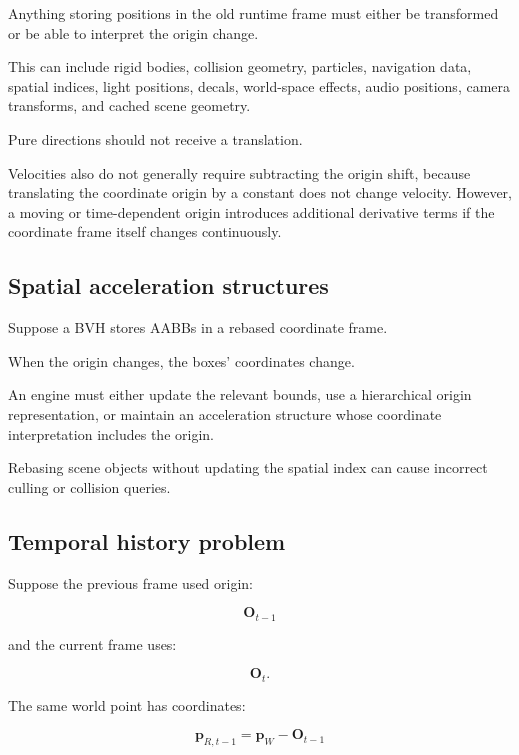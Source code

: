 Anything storing positions in the old runtime frame must either be transformed or be able to interpret the origin change.

This can include rigid bodies, collision geometry, particles, navigation data, spatial indices, light positions, decals, world-space effects, audio positions, camera transforms, and cached scene geometry.

Pure directions should not receive a translation.

Velocities also do not generally require subtracting the origin shift, because translating the coordinate origin by a constant does not change velocity. However, a moving or time-dependent origin introduces additional derivative terms if the coordinate frame itself changes continuously.

\subsection{Spatial acceleration structures}\label{02-foundations-ii-ch036-spatial-acceleration-structures}

\hypertarget{02-foundations-ii-ch036-spatial-acceleration-structures}{}

Suppose a BVH stores AABBs in a rebased coordinate frame.

When the origin changes, the boxes' coordinates change.

An engine must either update the relevant bounds, use a hierarchical origin representation, or maintain an acceleration structure whose coordinate interpretation includes the origin.

Rebasing scene objects without updating the spatial index can cause incorrect culling or collision queries.

\subsection{Temporal history problem}\label{02-foundations-ii-ch036-temporal-history-problem}

\hypertarget{02-foundations-ii-ch036-temporal-history-problem}{}

Suppose the previous frame used origin:

\[
 \mathbf O_{t-1}
\]

and the current frame uses:

\[
 \mathbf O_t.
\]

The same world point has coordinates:

\[
 \mathbf p_{R,t-1} = \mathbf p_W-\mathbf O_{t-1}
\]

